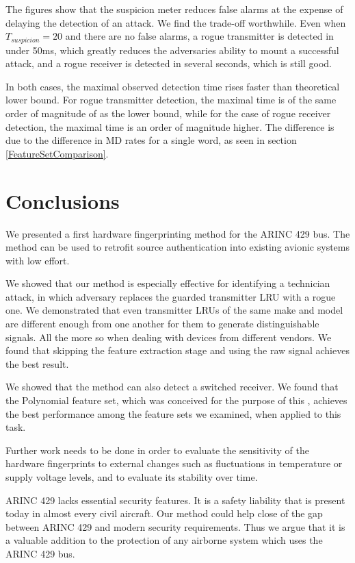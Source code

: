 \documentclass[compsoc,conference,a4paper]{IEEEtran}
\makeatletter
\newcommand{\level}[1]{\section{#1}}
\newcommand{\level}[1]{\chapter{#1}}
\newcommand{\enableopenany}{%
  \@openrightfalse%
}
\newcommand{\disableopenany}{%
  \@openrighttrue%
}
\newcommand{\newchapterevenpage}{%
    \enableopenany
    \chapter*{}
    \checkoddpage
    \ifoddpage
      \newpage
    \else
    \fi
    \disableopenany
  }
\makeatother
\begin{document}
  The figures show that the suspicion meter reduces false alarms at the expense of delaying the detection of an attack. We find the trade-off worthwhile. Even when $T_{suspicion} = 20$ and there are no false alarms, a rogue transmitter is detected in under 50ms, which greatly reduces the adversaries ability to mount a successful attack, and a rogue receiver is detected in several seconds, which is still good.
  
  In both cases, the maximal observed detection time rises faster than theoretical lower bound. For rogue transmitter detection, the maximal time is of the same order of magnitude of as the lower bound, while for the case of rogue receiver detection, the maximal time is an order of magnitude higher. The difference is due to the difference in MD rates for a single word, as seen in section \ref{FeatureSetComparison}.
  
\level{Conclusions} \label{Conclusions}
  We presented a first hardware fingerprinting method for the ARINC 429 bus. The method can be used to retrofit source authentication into existing avionic systems with low effort.
  
  We showed that our method is especially effective for identifying a technician attack, in which adversary replaces the guarded transmitter LRU with a rogue one. We demonstrated that even transmitter LRUs of the same make and model are different enough from one another for them to generate distinguishable signals. All the more so when dealing with devices from different vendors. We found that skipping the feature extraction stage and using the raw signal achieves the best result.
  
  We showed that the method can also detect a switched receiver. We found that the Polynomial feature set, which was conceived for the purpose of this \iftoggle{paper} {paper} {work}, achieves the best performance among the feature sets we examined, when applied to this task.
  
  Further work needs to be done in order to evaluate the sensitivity of the hardware fingerprints to external changes such as fluctuations in temperature or supply voltage levels, and to evaluate its stability over time.
  
  ARINC 429 lacks essential security features. It is a safety liability that is present today in almost every civil aircraft.
  Our method could help close of the gap between ARINC 429 and modern security requirements. Thus we argue that it is a valuable addition to the protection of any airborne system which uses the ARINC 429 bus.
  

 

\iftoggle{paper}{
}{
  \newchapterevenpage
  
}
\end{document}
